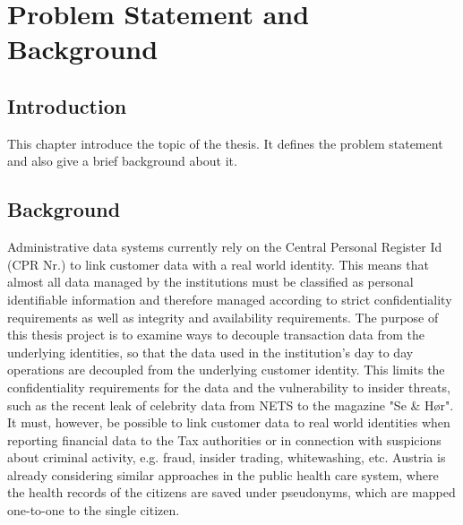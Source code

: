 \chapter{Problem Statement and Background}

\section{Introduction}
This chapter introduce the topic of the thesis. It defines the problem statement and also give a brief background about it.
\section{Background}
Administrative data systems currently rely on the Central Personal Register Id (CPR Nr.) to link customer data with a real world identity. This means that almost all data managed by the institutions must be classified as personal identifiable information and therefore managed according to strict confidentiality requirements as well as integrity and availability requirements. The purpose of this thesis project is to examine ways to decouple transaction data from the underlying identities, so that the data used in the institution's day to day operations are decoupled from the underlying customer identity. This limits the confidentiality requirements for the data and the vulnerability to insider threats, such as the recent leak of celebrity data from NETS to the magazine "Se \& Hør". It must, however, be possible to link customer data to real world identities when reporting financial data to the Tax authorities or in connection with suspicions about criminal activity, e.g. fraud, insider trading, whitewashing, etc. Austria is already considering similar approaches in the public health care system, where the health records of the citizens are saved under pseudonyms, which are mapped one-to-one to the single citizen.

